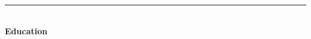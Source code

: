 \documentclass[10pt]{article}
\newenvironment{itemize*}%
  {\begin{itemize}%
    \setlength{\itemsep}{0pt}%
    \setlength{\parskip}{0pt}%
	}
  {\end{itemize}}
\begin{document}
\begin{itemize*}
\end{itemize*}
\rule{6.5in}{2pt}
\\
\vspace{0.10in}
{\large \textbf{Education}}
\end{document}
